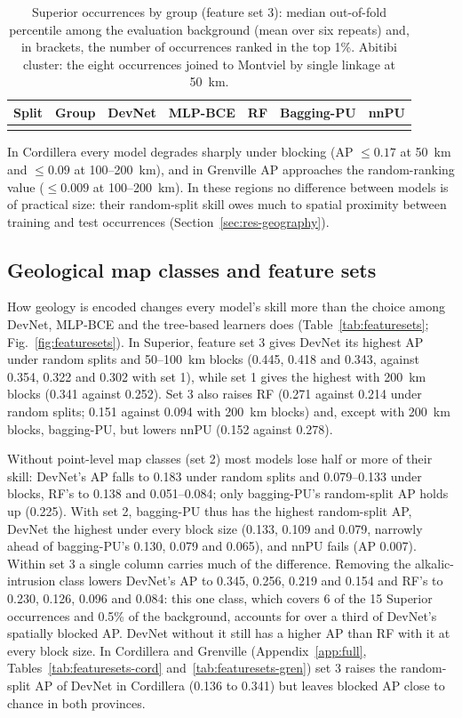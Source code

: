 \documentclass[pdflatex,sn-apa]{sn-jnl}
\begin{document}
\begin{table}[t]
\caption{Superior occurrences by group (feature set 3): median out-of-fold percentile among the evaluation background (mean over six repeats) and, in brackets, the number of occurrences ranked in the top 1\%. Abitibi cluster: the eight occurrences joined to Montviel by single linkage at 50~km.}\label{tab:occurrence}
\scriptsize
\setlength{\tabcolsep}{2.5pt}
\begin{tabular*}{\textwidth}{@{\extracolsep\fill}llccccc}
\toprule
Split & Group & DevNet & MLP-BCE & RF & Bagging-PU & nnPU \\
\midrule
\botrule
\end{tabular*}
\end{table}

In Cordillera every model degrades sharply under blocking (AP $\leq 0.17$ at 50~km and $\leq 0.09$ at 100--200~km), and in Grenville AP approaches the random-ranking value ($\leq 0.009$ at 100--200~km). In these regions no difference between models is of practical size: their random-split skill owes much to spatial proximity between training and test occurrences (Section~\ref{sec:res-geography}).

\subsection{Geological map classes and feature sets}\label{sec:res-featuresets}

How geology is encoded changes every model's skill more than the choice among DevNet, MLP-BCE and the tree-based learners does (Table~\ref{tab:featuresets}; Fig.~\ref{fig:featuresets}). In Superior, feature set 3 gives DevNet its highest AP under random splits and 50--100~km blocks (0.445, 0.418 and 0.343, against 0.354, 0.322 and 0.302 with set 1), while set 1 gives the highest with 200~km blocks (0.341 against 0.252). Set 3 also raises RF (0.271 against 0.214 under random splits; 0.151 against 0.094 with 200~km blocks) and, except with 200~km blocks, bagging-PU, but lowers nnPU (0.152 against 0.278).

Without point-level map classes (set 2) most models lose half or more of their skill: DevNet's AP falls to 0.183 under random splits and 0.079--0.133 under blocks, RF's to 0.138 and 0.051--0.084; only bagging-PU's random-split AP holds up (0.225). With set 2, bagging-PU thus has the highest random-split AP, DevNet the highest under every block size (0.133, 0.109 and 0.079, narrowly ahead of bagging-PU's 0.130, 0.079 and 0.065), and nnPU fails (AP 0.007). Within set 3 a single column carries much of the difference. Removing the alkalic-intrusion class lowers DevNet's AP to 0.345, 0.256, 0.219 and 0.154 and RF's to 0.230, 0.126, 0.096 and 0.084: this one class, which covers 6 of the 15 Superior occurrences and 0.5\% of the background, accounts for over a third of DevNet's spatially blocked AP. DevNet without it still has a higher AP than RF with it at every block size. In Cordillera and Grenville (Appendix~\ref{app:full}, Tables~\ref{tab:featuresets-cord} and~\ref{tab:featuresets-gren}) set 3 raises the random-split AP of DevNet in Cordillera (0.136 to 0.341) but leaves blocked AP close to chance in both provinces.
\end{document}
